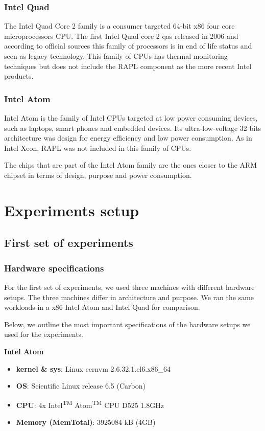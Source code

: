\subsubsection*{Intel Quad}

The Intel Quad Core 2 family \cite{quad_specs} is a consumer targeted 64-bit x86 four core microprocessors CPU. The first Intel Quad core 2 qas released in 2006 and according to official sources this family of processors is in end of life status and seen as legacy technology. This family of CPUs has thermal monitoring techniques but does not include the RAPL component as the more recent Intel products. 


\subsubsection*{Intel Atom}

Intel Atom \cite{atom_page} is the family of Intel CPUs targeted at low power consuming devices, such as laptops, smart phones and embedded devices. Its ultra-low-voltage 32 bits architecture was design for energy efficiency and low power consumption. As in Intel Xeon, RAPL was not included in this family of CPUs.

The chips that are part of the Intel Atom family are the ones closer to the ARM chipset in terms of design, purpose and power consumption.


\clearpage


\section{Experiments setup}
\subsection{First set of experiments}

\subsubsection*{Hardware specifications}
For the first set of experiments, we used three machines with different hardware setups. The three machines differ in architecture and purpose. We ran the same workloads in a x86 Intel Atom and Intel Quad for comparison.

Below, we outline the most important specifications of the hardware setups we used for the experiments.

\vspace{10mm}
\textbf{Intel Atom}
\begin{itemize}
  \item[] \textbf{kernel \& sys}:  Linux cern\-vm 2.6.32.1.el6.x86\_64
  \item[] \textbf{OS}: Scientific Linux release 6.5 (Carbon)
  \item[] \textbf{CPU}:   4x Intel\textsuperscript{TM} Atom\textsuperscript{TM} CPU D525 \@ 1.8GHz
  \item[] \textbf{Memory  (MemTotal)}:        3925084  kB (4GB)
\end{itemize}

